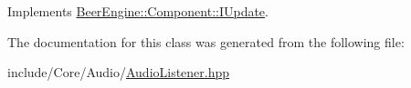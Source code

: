 Implements \mbox{\hyperlink{class_beer_engine_1_1_component_1_1_i_update_aeeda0aa303175720e449b4c51d9867dd}{Beer\+Engine\+::\+Component\+::\+I\+Update}}.



The documentation for this class was generated from the following file\+:\begin{DoxyCompactItemize}
\item 
include/\+Core/\+Audio/\mbox{\hyperlink{_audio_listener_8hpp}{Audio\+Listener.\+hpp}}\end{DoxyCompactItemize}
